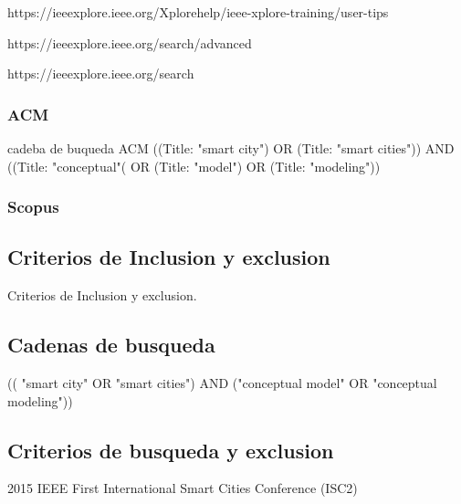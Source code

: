 \documentclass[runningheads,a4paper,spanish]{llncs}
\begin{document}
https://ieeexplore.ieee.org/Xplorehelp/ieee-xplore-training/user-tips

https://ieeexplore.ieee.org/search/advanced

https://ieeexplore.ieee.org/search

\subsubsection{ACM}\label{acm}



cadeba de buqueda ACM
((Title: "smart city") OR (Title: "smart cities")) AND ((Title: "conceptual"( OR (Title: "model") OR (Title: "modeling"))

\subsubsection{Scopus}\label{scopus}




\subsection{Criterios de Inclusion y exclusion}\label{criterio}

Criterios de Inclusion y exclusion.

\subsection{Cadenas de busqueda}\label{cadena}

(( "smart city" OR "smart cities") AND ("conceptual model" OR "conceptual modeling"))

\subsection{Criterios de busqueda y exclusion}\label{criterios}

2015 IEEE First International Smart Cities Conference (ISC2)
\end{document}

